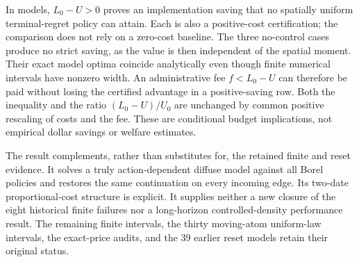 In \CRSavings{} models, $L_0-U>0$ proves an implementation saving that no spatially uniform terminal-regret policy can attain. Each is also a positive-cost certification; the comparison does not rely on a zero-cost baseline. The three no-control cases produce no strict saving, as the value is then independent of the spatial moment. Their exact model optima coincide analytically even though finite numerical intervals have nonzero width. An administrative fee $f<L_0-U$ can therefore be paid without losing the certified advantage in a positive-saving row. Both the inequality and the ratio $(L_0-U)/U_0$ are unchanged by common positive rescaling of costs and the fee. These are conditional budget implications, not empirical dollar savings or welfare estimates.

The result complements, rather than substitutes for, the retained finite and reset evidence. It solves a truly action-dependent diffuse model against all Borel policies and restores the same continuation on every incoming edge. Its two-date proportional-cost structure is explicit. It supplies neither a new closure of the eight historical finite failures nor a long-horizon controlled-density performance result. The remaining finite intervals, the thirty moving-atom uniform-law intervals, the exact-price audits, and the 39 earlier reset models retain their original status.
